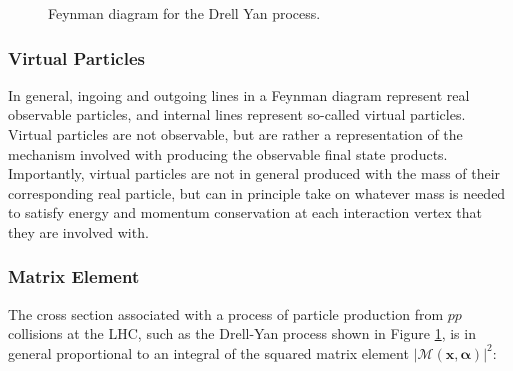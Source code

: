 \begin{figure}[h]
	\centering
	\caption{Feynman diagram for the Drell Yan process.}
	\label{fig:drell_yan}
\end{figure}

\subsubsection{Virtual Particles}
\label{sec:virtual_particles}

In general, ingoing and outgoing lines in a Feynman diagram represent real observable particles, and internal lines represent so-called virtual particles. Virtual particles are not observable, but are rather a representation of the mechanism involved with producing the observable final state products. Importantly, virtual particles are not in general produced with the mass of their corresponding real particle, but can in principle take on whatever mass is needed to satisfy energy and momentum conservation at each interaction vertex that they are involved with. 

\subsubsection{Matrix Element}


The cross section associated with a process of particle production from \(pp\) collisions at the LHC, such as the Drell-Yan process shown in Figure \ref{fig:drell_yan}, is in general proportional to an integral of the squared matrix element \(|\mathcal{M(\boldsymbol{x}, \boldsymbol{\alpha})}|^2\):

